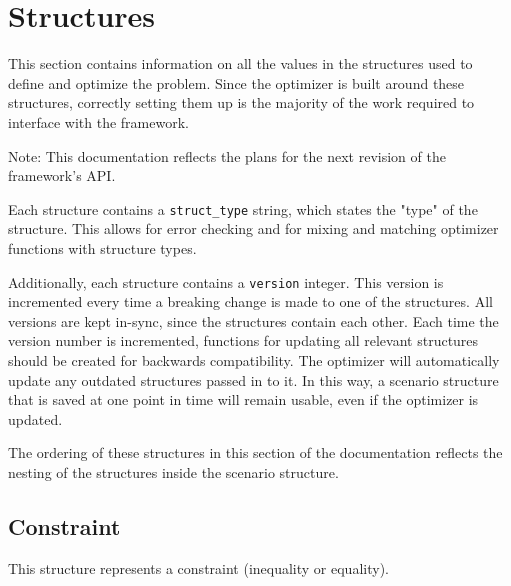 \documentclass{article}
\begin{document}
	\section{Structures}
		This section contains information on all the values in the structures used to define and optimize the problem.
		Since the optimizer is built around these structures, correctly setting them up is the majority of the work required to
		interface with the framework.

		Note: This documentation reflects the plans for the next revision of the framework's API.

		Each structure contains a \lstinline|struct_type| string, which states the "type" of the structure.
		This allows for error checking and for mixing and matching optimizer functions with structure types.

		Additionally, each structure contains a \lstinline|version| integer. This version is incremented every time a breaking
		change is made to one of the structures. All versions are kept in-sync, since the structures contain each other.
		Each time the version number is incremented, functions for updating all relevant structures should be created for backwards
		compatibility. The optimizer will automatically update any outdated structures passed in to it. In this way, a scenario structure
		that is saved at one point in time will remain usable, even if the optimizer is updated.

		The ordering of these structures in this section of the documentation reflects
		the nesting of the structures inside the scenario structure.

		\subsection{Constraint}
			\label{sec:constraint} %

			This structure represents a constraint (inequality or equality).

			\vspace{\baselineskip}
\end{document}
